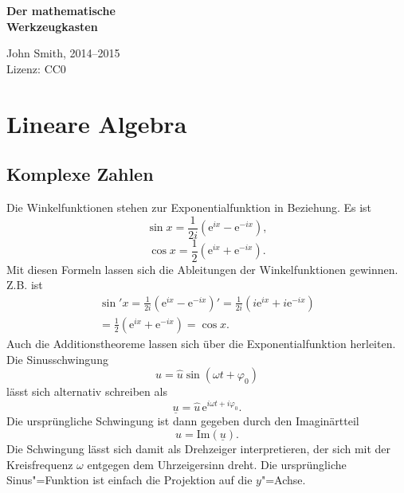 \documentclass[a4paper,10pt,fleqn,twocolumn,twoside]{article}
\begin{document}

\begin{huge}
\noindent
\textbf{Der mathematische\\
Werkzeugkasten}
\par
\end{huge}
\vspace{1em}
\noindent
John Smith, 2014--2015\\
Lizenz: CC0

\tableofcontents



\newpage
\section{Lineare Algebra}
\subsection{Komplexe Zahlen}

Die Winkelfunktionen stehen zur Exponentialfunktion
in Beziehung. Es ist
\[\sin x = \frac{1}{2i}(\mathrm{e}^{ix}-\mathrm{e}^{-ix}),\]
\[\cos x = \frac{1}{2}(\mathrm{e}^{ix}+\mathrm{e}^{-ix}).\]
%
Mit diesen Formeln lassen sich die Ableitungen der Winkelfunktionen
gewinnen. Z.B. ist
\begin{gather*}
\sin' x = \frac{1}{2i}(\mathrm{e}^{ix}-\mathrm{e}^{-ix})'
= \frac{1}{2i}(i\mathrm{e}^{ix}+i\mathrm{e}^{-ix})\\
= \frac{1}{2}(\mathrm{e}^{ix}+\mathrm{e}^{-ix})
= \cos x.
\end{gather*}
Auch die Additionstheoreme lassen sich über die Exponentialfunktion
herleiten. Die Sinusschwingung
\[u = \hat u\sin(\omega t+\varphi_0)\]
%
lässt sich alternativ schreiben als
\[\underline u = \hat u\,\mathrm{e}^{i\omega t+i\varphi_0}.\]
%
Die ursprüngliche Schwingung ist dann gegeben durch den Imaginärtteil
\[u = \mathrm{Im}(\underline u).\]
%
Die Schwingung lässt sich damit als Drehzeiger interpretieren, der
sich mit der Kreisfrequenz \(\omega\) entgegen dem Uhrzeigersinn
dreht. Die ursprüngliche Sinus"=Funktion ist einfach die Projektion
auf die \(y\)"=Achse.
\end{document}
